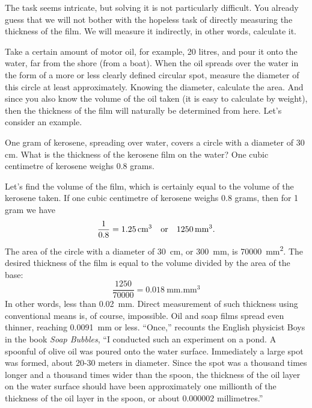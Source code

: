 The task seems intricate, but solving it is not particularly difficult. You already guess that we will not bother with the hopeless task of directly measuring the thickness of the film. We will measure it indirectly, in other words, calculate it.

Take a certain amount of motor oil, for example, 20 litres, and pour it onto the water, far from the shore (from a boat). When the oil spreads over the water in the form of a more or less clearly defined circular spot, measure the diameter of this circle at least approximately. Knowing the diameter, calculate the area. And since you also know the volume of the oil taken (it is easy to calculate by weight), then the thickness of the film will naturally be determined from here. Let's consider an example.


\ques One gram of kerosene, spreading over water, covers a circle with a diameter of 30 cm. What is the thickness of the kerosene film on the water? One cubic centimetre of kerosene weighs 0.8 grams.

\ans Let's find the volume of the film, which is certainly equal to the volume of the kerosene taken. If one cubic centimetre of kerosene weighs 0.8 grams, then for 1 gram we have 
\begin{equation*}%
\frac{1}{0.8} = \SI{1.25}{\centi\meter\cubed} \qor \SI{1250}{\milli\meter\cubed}.
\end{equation*}
The area of the circle with a diameter of \SI{30}{\centi\meter}, or \SI{300}{\milli\meter}, is  \SI{70000}{\milli\meter\squared}. The desired thickness of the film is equal to the volume divided by the area of the base:
\begin{equation*}%
\frac{1250}{70000} = \SI{0.018}{\milli\meter}.
\si{\milli\meter\cubed}
\end{equation*}
In other words, less than \SI{0.02}{\milli\meter}. Direct measurement of such thickness using conventional means is, of course, impossible. Oil and soap films spread even thinner, reaching \SI{0.0091}{\milli\meter} or less. ``Once,'' recounts the English physicist Boys in the book \emph{Soap Bubbles}, ``I conducted such an experiment on a pond. A spoonful of olive oil was poured onto the water surface. Immediately a large spot was formed, about 20-30 meters in diameter. Since the spot was a thousand times longer and a thousand times wider than the spoon, the thickness of the oil layer on the water surface should have been approximately one millionth of the thickness of the oil layer in the spoon, or about 0.000002 millimetres.''


